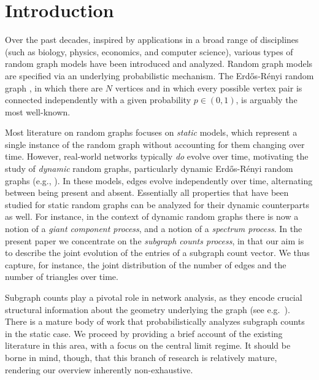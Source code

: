 \documentclass[11pt,reqno]{amsart}
\numberwithin{equation}{section}
\begin{document}
\newpage



\section{Introduction}\label{section:introduction}

Over the past decades, inspired by applications in a broad range of disciplines (such as biology, physics, economics, and computer science), various types of random graph models have been introduced and analyzed.  
Random graph models are specified via an underlying probabilistic mechanism. 
The Erd\H{o}s-R\'enyi random graph \cite{erdos1959random, gilbert1959random}, in which there are $N$ vertices and in which every possible vertex pair is connected independently with a given probability $p\in(0,1)$, is arguably the most well-known. 


Most literature on random graphs focuses on {\it static} models, which represent a single instance of the random graph without accounting for them changing over time. However, real-world networks typically {\it do} evolve over time, motivating the study of {\it dynamic} random graphs, particularly dynamic Erd\H{o}s-R\'enyi random graphs (e.g., \cite{zhang2017random, mandjes2019dynamic, holme2012temporal, holme2015modern, braunsteins2023sample}).  In these models, edges evolve independently over time, alternating between being present and absent. Essentially all properties that have been studied for static random graphs can be analyzed for their dynamic counterparts as well. For instance, in the context of dynamic random graphs there is now a notion of a {\it giant component process}, and a notion of a {\it spectrum process}. In the present paper we concentrate on the {\it subgraph counts process}, in that our aim is to describe the joint evolution of the entries of a subgraph count vector. We thus capture, for instance, the joint distribution of the number of edges and the number of triangles over time. 

\medskip

Subgraph counts play a pivotal role in network analysis, as they encode crucial structural information about the geometry underlying the graph (see e.g.\ \cite{frank1986markov, kendall1940method, moran1947method, holland1971transitivity, holland1976local, harary1979matrix, frank1980transitivity, frank1982cluster, andrade:bhattacharya:2025}). 
There is a mature body of work that probabilistically analyzes subgraph counts in the static case.
We proceed by providing a brief account of the existing literature in this area, with a focus on the central limit regime. It should be borne in mind, though, that this branch of research is relatively mature, rendering our overview inherently non-exhaustive. 
\end{document}
